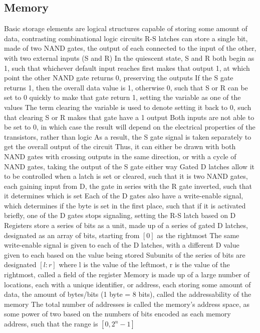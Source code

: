\documentclass[11 pt, twoside]{article}
\newenvironment{outline*}
{
	\begin{outline}[enumerate]
	}
	{\end{outline}
}
\begin{document}
\subsection{Memory}
\begin{outline*}
\1 Basic storage elements are logical structures capable of storing some amount of data, contrasting combinational logic circuits
\2 R-S latches can store a single bit, made of two NAND gates, the output of each connected to the input of the other, with two external inputs (S and R)
\3 In the quiescent state, S and R both begin as 1, such that whichever default input reaches first makes that output 1, at which point the other NAND gate returns 0, preserving the outputs
\3 If the S gate returns 1, then the overall data value is 1, otherwise 0, such that S or R can be set to 0 quickly to make that gate return 1, setting the variable as one of the values
\3 The term clearing the variable is used to denote setting it back to 0, such that clearing S or R makes that gate have a 1 output
\3 Both inputs are not able to be set to 0, in which case the result will depend on the electrical properties of the transistors, rather than logic
\3 As a result, the S gate signal is taken separately to get the overall output of the circuit
\3 Thus, it can either be drawn with both NAND gates with crossing outputs in the same direction, or with a cycle of NAND gates, taking the output of the S gate either way
\2 Gated D latches allow it to be controlled when a latch is set or cleared, such that it is two NAND gates, each gaining input from D, the gate in series with the R gate inverted, such that it determines which is set
\3 Each of the D gates also have a write-enable signal, which determines if the byte is set in the first place, such that if it is activated briefly, one of the D gates stops signaling, setting the R-S latch based on D
\2 Registers store a series of bits as a unit, made up of a series of gated D latches, designated as an array of bits, starting from $[0]$ as the rightmost
\3 The same write-enable signal is given to each of the D latches, with a different D value given to each based on the value being stored
\3 Subunits of the series of bits are designated $[l:r]$ where l is the value of the leftmost, r is the value of the rightmost, called a field of the register
\1 Memory is made up of a large number of locations, each with a unique identifier, or address, each storing some amount of data, the amount of bytes/bits (1 byte = 8 bits), called the addressability of the memory
\2 The total number of addresses is called the memory's address space, as some power of two based on the numbers of bits encoded as each memory address, such that the range is $[0, 2^{n} - 1]$

\end{outline*}
\end{document}
